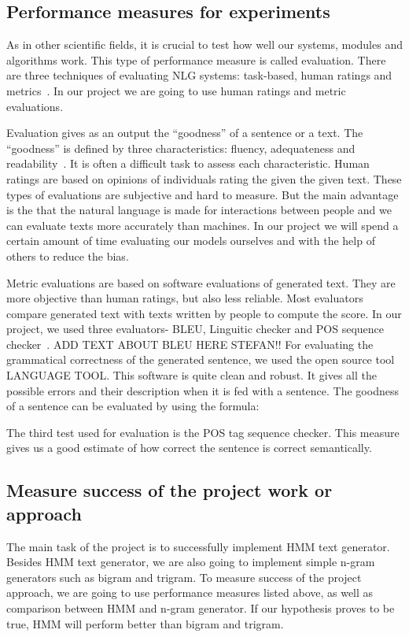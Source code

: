 \documentclass[a4paper,12pt]{article}
\begin{document}
\subsection {Performance measures for experiments}

As in other scientific fields, it is crucial to test how well our systems,
modules and algorithms work. This type of performance measure is called
evaluation. There are three techniques of evaluating NLG systems: task-based,
human ratings and metrics~\cite{evalnlg}. In our project we are going to use
human ratings and metric evaluations.

Evaluation gives as an output the ``goodness'' of a sentence or a text. The
``goodness'' is defined by three characteristics: fluency, adequateness and
readability~\cite{evalmethods}. It is often a difficult task to assess each
characteristic.
Human ratings are based on opinions of individuals rating the given the given
text. These types of evaluations are subjective and hard to measure. But the
main advantage is the that the natural language is made for interactions between
people and we can evaluate texts more accurately than machines. In our project
we will spend a certain amount of time evaluating our models ourselves and with
the help of others to reduce the bias.

Metric evaluations are based on software evaluations of generated text. They are
more objective than human ratings, but also less reliable. Most evaluators
compare generated text with texts written by people to compute the score. In our
project, we used three evaluators- BLEU, Linguitic checker and POS sequence checker~\cite{autoeval}.
ADD TEXT ABOUT BLEU HERE STEFAN!!
For evaluating the grammatical correctness of the generated sentence, we used the
open source tool LANGUAGE TOOL. This software is quite clean and robust. It gives 
all the possible errors and their description when it is fed with a sentence. The 
goodness of a sentence can be evaluated by using the formula: 

The third test used for evaluation is the POS tag sequence checker. This measure 
gives us a good estimate of how correct the sentence is correct semantically.

\subsection {Measure success of the project work or approach}

The main task of the project is to successfully implement HMM text generator.
Besides HMM text generator, we are also going to implement simple n-gram
generators such as bigram and trigram. To measure success of the project
approach, we are going to use performance measures listed above, as well as
comparison between HMM and n-gram generator. If our hypothesis proves to be
true, HMM will perform better than bigram and trigram.
\end{document}
